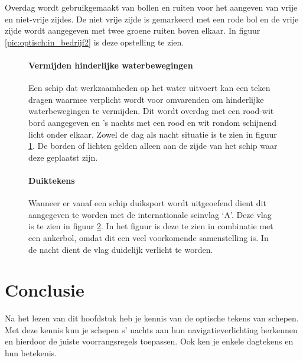 Overdag wordt gebruikgemaakt van bollen en ruiten voor het aangeven van vrije en niet-vrije zijdes. De niet vrije zijde is gemarkeerd met een rode bol en de vrije zijde wordt aangegeven met twee groene ruiten boven elkaar. In figuur \ref{pic:optisch:in_bedrijf2} is deze opstelling te zien.

\begin{figure}[H]
	\centering
	\begin{minipage}[t]{0.75\textwidth}
		\paragraph{Vermijden hinderlijke waterbewegingen}
		Een schip dat werkzaamheden op het water uitvoert kan een teken dragen waarmee verplicht wordt voor omvarenden om hinderlijke waterbewegingen te vermijden. Dit wordt overdag met een rood-wit bord aangegeven en 's nachts met een rood en wit rondom schijnend licht onder elkaar. Zowel de dag als nacht situatie is te zien in figuur  \ref{pic:optisch:hinder}. De borden of lichten gelden alleen aan de zijde van het schip waar deze geplaatst zijn.
	\end{minipage}
	\hfill
	\begin{minipage}[t]{0.22\textwidth}
		\RemoveLine
		\caption{}
		\label{pic:optisch:hinder}
	\end{minipage}
\end{figure}

\begin{figure}[H]
	\centering
	\begin{minipage}[t]{0.75\textwidth}
		\paragraph{Duiktekens}
		Wanneer er vanaf een schip duiksport wordt uitgeoefend dient dit aangegeven te worden met de internationale seinvlag `A'. Deze vlag is te zien in figuur  \ref{pic:optisch:duik}. In het figuur is deze te zien in combinatie met een ankerbol, omdat dit een veel voorkomende samenstelling is. In de nacht dient de vlag duidelijk verlicht te worden.
	\end{minipage}
	\hfill
	\begin{minipage}[t]{0.22\textwidth}
		\RemoveLine
		\caption{}
		\label{pic:optisch:duik}
	\end{minipage}
\end{figure}

\section{Conclusie}
Na het lezen van dit hoofdstuk heb je kennis van de optische tekens van schepen. Met deze kennis kun je schepen s' nachts aan hun navigatieverlichting herkennen en hierdoor de juiste voorrangsregels toepassen. Ook ken je enkele dagtekens en hun betekenis.
